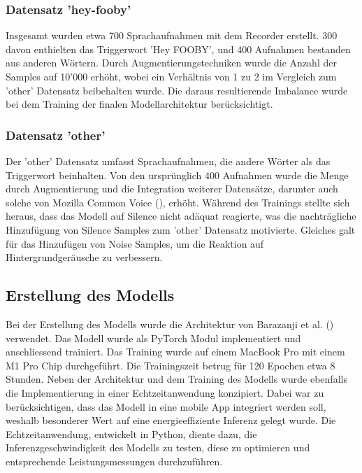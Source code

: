 \documentclass[11pt,a4paper]{article}
\begin{document}
\subsubsection{Datensatz 'hey-fooby'}
Insgesamt wurden etwa 700 Sprachaufnahmen mit dem Recorder erstellt. 300 davon enthielten das 
Triggerwort 'Hey FOOBY', und 400 Aufnahmen bestanden aus anderen Wörtern. Durch 
Augmentierungstechniken wurde die Anzahl der Samples auf 10'000 erhöht, wobei ein Verhältnis von 
1 zu 2 im Vergleich zum 'other' Datensatz beibehalten wurde. Die daraus resultierende 
Imbalance wurde bei dem Training der finalen Modellarchitektur berücksichtigt.

\subsubsection{Datensatz 'other'}
Der 'other' Datensatz umfasst Sprachaufnahmen, die andere Wörter als das Triggerwort beinhalten. 
Von den ursprünglich 400 Aufnahmen wurde die Menge durch Augmentierung und die Integration 
weiterer Datensätze, darunter auch solche von Mozilla Common Voice (\cite{ardila2020common}), 
erhöht. Während des Trainings stellte sich heraus, dass das Modell auf Silence nicht adäquat 
reagierte, was die nachträgliche Hinzufügung von Silence Samples zum 'other' Datensatz motivierte. 
Gleiches galt für das Hinzufügen von Noise Samples, um die Reaktion auf Hintergrundgeräusche zu 
verbessern.


\newpage

\subsection{Erstellung des Modells}
Bei der Erstellung des Modells wurde die Architektur von Barazanji et al. 
(\cite{barazanji2023heyditto}) verwendet. Das Modell wurde als PyTorch 
Modul implementiert und anschliessend trainiert. Das Training wurde auf einem MacBook Pro mit einem M1 Pro Chip 
durchgeführt. Die Trainingszeit betrug für 120 Epochen etwa 8 Stunden. Neben der Architektur und 
dem Training des Modells wurde ebenfalls die Implementierung in einer Echtzeitanwendung konzipiert. 
Dabei war zu berücksichtigen, dass das Modell in eine mobile App integriert werden soll, weshalb 
besonderer Wert auf eine energieeffiziente Inferenz gelegt wurde. Die Echtzeitanwendung, entwickelt 
in Python, diente dazu, die Inferenzgeschwindigkeit des Modells zu testen, diese zu optimieren und 
entsprechende Leistungsmessungen durchzuführen.
\end{document}
